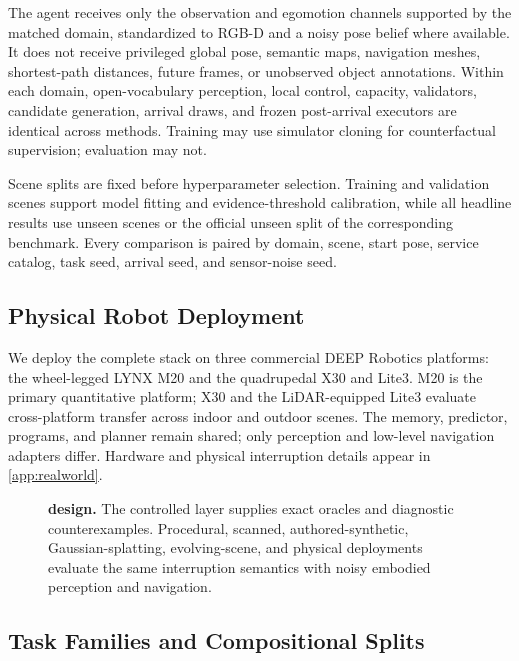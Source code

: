 The agent receives only the observation and egomotion channels supported by the matched domain, standardized to RGB-D and a noisy pose belief where available.
It does not receive privileged global pose, semantic maps, navigation meshes, shortest-path distances, future frames, or unobserved object annotations.
Within each domain, open-vocabulary perception, local control, \rfm{} capacity, validators, candidate generation, arrival draws, and frozen post-arrival executors are identical across methods.
Training may use simulator cloning for counterfactual supervision; evaluation may not.

Scene splits are fixed before hyperparameter selection.
Training and validation scenes support model fitting and evidence-threshold calibration, while all headline results use unseen scenes or the official unseen split of the corresponding benchmark.
Every comparison is paired by domain, scene, start pose, service catalog, task seed, arrival seed, and sensor-noise seed.

\subsection{Physical Robot Deployment}
\label{sec:realworld-benchmark}

We deploy the complete \method{} stack on three commercial DEEP Robotics platforms: the wheel-legged LYNX M20 and the quadrupedal X30 and Lite3.
M20 is the primary quantitative platform; X30 and the LiDAR-equipped Lite3 evaluate cross-platform transfer across indoor and outdoor scenes.
The memory, \jet{} predictor, programs, and planner remain shared; only perception and low-level navigation adapters differ.
Hardware and physical interruption details appear in \cref{app:realworld}.

\begin{figure}[t]
  \centering
  \caption{\textbf{\bench{} design.}
  The controlled layer supplies exact oracles and diagnostic counterexamples.
  Procedural, scanned, authored-synthetic, Gaussian-splatting, evolving-scene, and physical deployments evaluate the same interruption semantics with noisy embodied perception and navigation.}
  \label{fig:benchmark}
\end{figure}

\subsection{Task Families and Compositional Splits}

